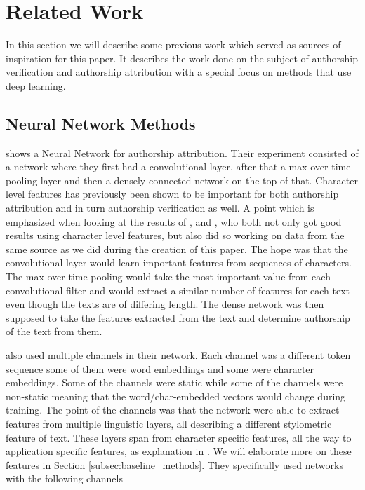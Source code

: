 \section{Related Work} \label{sec:related_work}

In this section we will describe some previous work which served as sources
of inspiration for this paper. It describes the work done on the subject of
authorship verification and authorship attribution with a special focus on
methods that use deep learning.


\subsection{Neural Network Methods}

\citet{DBLP:journals/corr/RuderGB16c} shows a Neural Network for authorship
attribution. Their experiment consisted of a network where they first had
a convolutional layer, after that a max-over-time pooling layer and then a
densely connected network on the top of that. Character level features has
previously been shown to be important for both authorship attribution and in
turn authorship verification as well. A point which is emphasized when looking
at the results of \citet{hansen2014}, and \citet{aalykke2016}, who both not only
got good results using character level features, but also did so working on
data from the same source as we did during the creation of this paper. The hope
was that the convolutional layer would learn important features from sequences
of characters. The max-over-time pooling would take the most important value
from each convolutional filter and would extract a similar number of features
for each text even though the texts are of differing length. The dense network
was then supposed to take the features extracted from the text and determine
authorship of the text from them.

\citet{DBLP:journals/corr/RuderGB16c} also used multiple channels in their
network. Each channel was a different token sequence some of them were word
embeddings and some were character embeddings. Some of the channels were static
while some of the channels were non-static meaning that the word/char-embedded
vectors would change during training. The point of the channels was that the
network were able to extract features from multiple linguistic layers, all
describing a different stylometric feature of text. These layers span from
character specific features, all the way to application specific features,
as explanation in \citet[Section 2]{stamatos2009}. We will elaborate more on
these features in Section \ref{subsec:baseline_methods}. They specifically used
networks with the following channels

